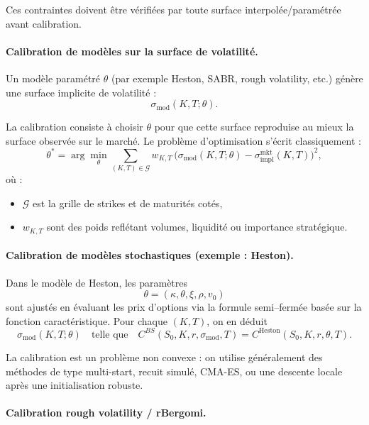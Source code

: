 \documentclass[11pt,a4paper]{article}
\newcommand{\1}{\mathbf{1}}
\begin{document}
Ces contraintes doivent être vérifiées par toute surface interpolée/paramétrée
avant calibration.

\paragraph{Calibration de mod\`eles sur la surface de volatilit\'e.}

Un mod\`ele param\'etr\'e $\theta$ (par exemple Heston, SABR, rough volatility, etc.)
génère une surface implicite de volatilité :
\[
\sigma_{\mathrm{mod}}(K,T;\theta).
\]

La calibration consiste à choisir $\theta$ pour que cette surface reproduise au
mieux la surface observée sur le marché. Le problème d'optimisation s'écrit
classiquement :
\[
\theta^*
=
\arg\min_{\theta}
\sum_{(K,T)\in \mathcal{G}}
w_{K,T}\,
\bigl(
\sigma_{\mathrm{mod}}(K,T;\theta)
-
\sigma_{\mathrm{impl}}^{\mathrm{mkt}}(K,T)
\bigr)^2,
\]
où :
\begin{itemize}
  \item $\mathcal{G}$ est la grille de strikes et de maturités cotés,
  \item $w_{K,T}$ sont des poids reflétant volumes, liquidité ou importance stratégique.
\end{itemize}

\paragraph{Calibration de mod\`eles stochastiques (exemple : Heston).}

Dans le mod\`ele de Heston, les param\`etres
\[
\theta = (\kappa,\theta,\xi,\rho,v_0)
\]
sont ajustés en évaluant les prix d'options via la formule semi--fermée basée
sur la fonction caractéristique. Pour chaque $(K,T)$, on en déduit
\[
\sigma_{\mathrm{mod}}(K,T;\theta)
\quad\text{telle que}\quad
C^{BS}(S_0,K,r,\sigma_{\mathrm{mod}},T)
= C^{\mathrm{Heston}}(S_0,K,r,\theta,T).
\]

La calibration est un problème non convexe : on utilise généralement des méthodes
de type multi-start, recuit simulé, CMA-ES, ou une descente locale après une
initialisation robuste.

\paragraph{Calibration rough volatility / rBergomi.}
\end{document}
